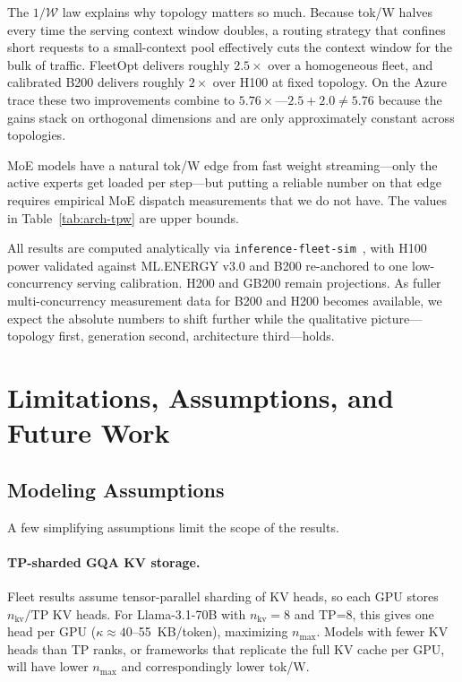 \documentclass[11pt,a4paper]{article}
\newcommand{\nmax}{n_{\max}}
\begin{document}
The $1/\mathcal{W}$ law explains why topology matters so much.  Because tok/W
halves every time the serving context window doubles, a routing strategy that
confines short requests to a small-context pool effectively cuts the context
window for the bulk of traffic.  FleetOpt delivers roughly $2.5\times$ over
a homogeneous fleet, and calibrated B200 delivers roughly $2\times$ over H100
at fixed topology.  On the Azure trace these two improvements combine to
$5.76\times$---$2.5 + 2.0 \neq 5.76$ because the gains stack on orthogonal
dimensions and are only approximately constant across topologies.

MoE models have a natural tok/W edge from fast weight streaming---only the
active experts get loaded per step---but putting a reliable number on that
edge requires empirical MoE dispatch measurements that we do not have.  The
values in Table~\ref{tab:arch-tpw} are upper bounds.

All results are computed analytically via
\texttt{inference-fleet-sim}~\citep{chen2026fleetsim}, with H100 power
validated against ML.ENERGY v3.0 and B200 re-anchored to one low-concurrency
serving calibration.  H200 and GB200 remain projections.  As fuller
multi-concurrency measurement data for B200 and H200 becomes available, we
expect the absolute numbers to shift further while the qualitative picture---
topology first, generation second, architecture third---holds.

\section{Limitations, Assumptions, and Future Work}
\label{sec:limitations}

\subsection{Modeling Assumptions}
\label{sec:assumptions}

A few simplifying assumptions limit the scope of the results.

\paragraph{TP-sharded GQA KV storage.}
Fleet results assume tensor-parallel sharding of KV heads, so each GPU stores
$n_{\text{kv}}/\text{TP}$ KV heads.  For Llama-3.1-70B with $n_{\text{kv}}
= 8$ and TP=8, this gives one head per GPU ($\kappa \approx 40$--55~KB/token),
maximizing $\nmax$.  Models with fewer KV heads than TP ranks, or frameworks
that replicate the full KV cache per GPU, will have lower $\nmax$ and
correspondingly lower tok/W.
\end{document}
